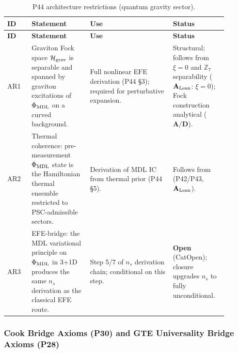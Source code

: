 \begingroup\footnotesize\renewcommand{\arraystretch}{1.2}
\begin{longtable}{@{}P{0.10\linewidth}P{0.24\linewidth}P{0.34\linewidth}P{0.22\linewidth}@{}}
\caption{P44 architecture restrictions (quantum gravity sector).}
\label{tab:mi-p44-axioms}\\
\toprule
\textbf{ID} & \textbf{Statement} & \textbf{Use} & \textbf{Status} \\
\midrule
\endfirsthead
\midrule
\textbf{ID} & \textbf{Statement} & \textbf{Use} & \textbf{Status} \\
\midrule
\endhead
\bottomrule
\endfoot
AR1 & Graviton Fock space $\mathcal{H}_{\rm grav}$ is separable and spanned by graviton
  excitations of $\Phi_{\rm MDL}$ on a curved background. &
  Full nonlinear EFE derivation (P44 \S3); required for
  perturbative expansion. &
  Structural; follows from $\xi=0$ and $\mathbb{Z}_7$ separability ($\textbf{A}_{\rm Lean}$: $\xi=0$);
  Fock construction analytical ($\mathbf{A/D}$). \\
AR2 & Thermal coherence: pre-measurement $\Phi_{\rm MDL}$ state is
  the Hamiltonian thermal ensemble restricted to PSC-admissible sectors. &
  Derivation of MDL IC from thermal prior (P44 \S5). &
  Follows from  (P42/P43, $\textbf{A}_{\rm Lean}$). \\
AR3 & EFE-bridge: the MDL variational principle on $\Phi_{\rm MDL}$ in 3+1D
  produces the same $n_s$ derivation as the classical EFE route. &
  Step 5/7 of $n_s$ derivation chain; conditional on this step. &
  \textbf{Open} (CatOpen); closure upgrades $n_s$ to fully unconditional. \\
\end{longtable}
\endgroup

\subsubsection{Cook Bridge Axioms (P30) and GTE Universality Bridge Axioms (P28)}
\label{sec:mi-bridge-axioms}

